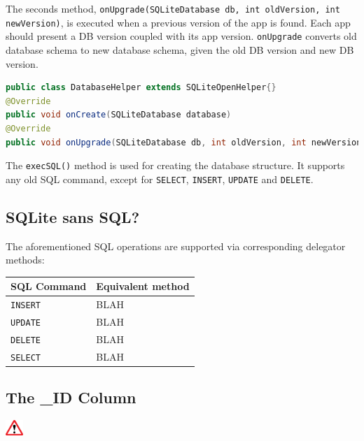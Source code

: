 \documentclass{article}
\def\cw#1{\texttt{#1}}
\begin{document}
The seconds method, \cw{onUpgrade(SQLiteDatabase db, int oldVersion, int newVersion)}, is executed when a previous version of the app is found. Each app should present a DB version coupled with its app version. \cw{onUpgrade} converts old database schema to new database schema, given the old DB version and new DB version.

\begin{code} \begin{lstlisting}[language=Java]
public class DatabaseHelper extends SQLiteOpenHelper{}
@Override
public void onCreate(SQLiteDatabase database)
@Override
public void onUpgrade(SQLiteDatabase db, int oldVersion, int newVersion)
\end{lstlisting} \end{code}

The \cw{execSQL()} method is used for creating the database structure. It supports any old SQL command, except for \cw{SELECT}, \cw{INSERT}, \cw{UPDATE} and \cw{DELETE}.

\subsection{SQLite sans SQL?}
The aforementioned SQL operations are supported via corresponding delegator methods:

\begin{center}
    \begin{tabular}{ | l | l |}
    \hline
    SQL Command & Equivalent method \\ \hline
    \cw{INSERT} & BLAH \\ \hline
    \cw{UPDATE} & BLAH \\ \hline
    \cw{DELETE} & BLAH \\ \hline
    \cw{SELECT} & BLAH \\ \hline
    \end{tabular}
\end{center}

\subsection{The \_ID Column}

\begin{center}
\includegraphics[width=0.05\textwidth]{img/warning_sign.eps}
\end{center}
\end{document}
